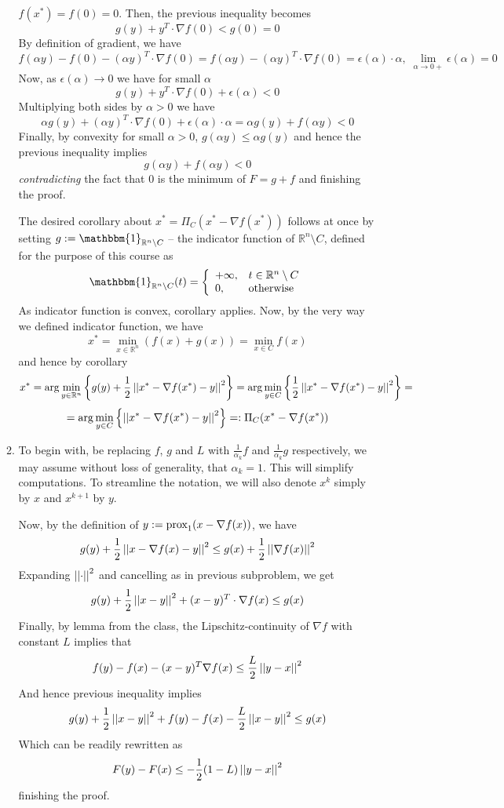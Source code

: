 \documentclass[8pt]{article} %
\begin{document}
\begin{enumerate}[label=\bfseries Problem \arabic*.]
\begin{enumerate}[label=(\alph*)]
				$f(x^*)=f(0)=0$. Then, the previous inequality becomes
				\[g(y)+y^T\cdot\nabla f(0)<g(0)=0\]
				By definition of gradient, we have
				\[f(\alpha y)-f(0)-(\alpha y)^T\cdot\nabla f(0)=
				f(\alpha y)-(\alpha y)^T\cdot\nabla f(0)=\epsilon(\alpha)\cdot
				{\alpha},\;\lim_{\alpha\to0+}\epsilon(\alpha)=0\]
				Now, as $\epsilon(\alpha)\to0$ we have for small $\alpha$
				\[g(y)+y^T\cdot\nabla f(0)+\epsilon(\alpha)<0\]
				Multiplying both sides by $\alpha>0$ we have
				\[\alpha g( y)+(\alpha y)^T\cdot\nabla f(0)+\epsilon(\alpha)\cdot\alpha=\alpha g(y)+f(\alpha y)<0\]
				Finally, by convexity for small $\alpha>0$, $g(\alpha y)\leq\alpha g(y)$ and hence the previous inequality
				implies
				\[ g(\alpha y)+f(\alpha y)<0\]
				{\it contradicting} the fact that $0$ is the minimum of $F=g+f$ and finishing the proof.
				
				The desired corollary about $x^*=\Pi_C(x^*-\nabla f(x^*))$ follows at once by setting $g:=\mathbbm{1}_{\mathbb{R}^n
				\setminus C}$ -- the indicator function of ${\mathbb{R}^n\setminus C}$, defined for the purpose of this course as
				\[\mathbbm{1}_{\mathbb{R}^n\setminus C}(t)=\left\{\begin{array}{ll}
					+\infty,&t\in\mathbb{R}^n\setminus C\\
					0,&\mbox{otherwise}
				\end{array}\right.\]
				As indicator function is convex, corollary applies. Now, by the very way we defined indicator function, we have
				\[x^*=\min_{x\in\mathbb{R}^n}(f(x)+g(x))=\min_{x\in C}f(x)\]
				and hence by corollary
				\[x^*=\arg\min_{y\in\mathbb{R}^n}\mycbra{g(y)+\frac{1}{2}\mynorm{x^*-\nabla f(x^*)-y}^2}=
				\arg\min_{y\in C}\mycbra{\frac{1}{2}\mynorm{x^*-\nabla f(x^*)-y}^2}=\]
				\[=\arg\min_{y\in C}\mycbra{\mynorm{x^*-\nabla f(x^*)-y}^2}=:\Pi_C(x^*-\nabla f(x^*))\]
			\item To begin with, be replacing $f$, $g$ and $L$
				with $\frac{1}{\alpha_k}f$ and $\frac{1}{\alpha_k}g$ respectively, we may assume without loss of generality,
				that $\alpha_k=1$. This will simplify computations. To streamline the notation, we will also denote $x^k$ simply
				by $x$ and $x^{k+1}$ by $y$.

				Now, by the definition of $y:=\mbox{prox}_1(x-\nabla f(x))$, we have
				\[g(y)+\frac{1}{2}\left|\left|x-\nabla f(x)-y\right|\right|^2\leq g(x)+\frac{1}{2}\left|\left|\nabla f(x)\right|\right|^2\]
				Expanding $\left|\left|\cdot\right|\right|^2$ and cancelling as in previous subproblem, we get
				\[g(y)+\frac{1}{2}\left|\left|x-y\right|\right|^2+(x-y)^T\cdot\nabla f(x)\leq g(x)\]
				Finally, by lemma from the class, the Lipschitz-continuity of $\nabla f$ with constant $L$ implies that
				\[f(y)-f(x)-(x-y)^T\nabla f(x)\leq \frac{L}{2}\left|\left|y-x\right|\right|^2\]
				And hence previous inequality implies
				\[g(y)+\frac{1}{2}\left|\left|x-y\right|\right|^2+f(y)-f(x)-\frac{L}{2}\left|\left|x-y\right|\right|^2\leq g(x)\]
				Which can be readily rewritten as
				\[F(y)-F(x)\leq -\frac{1}{2}(1-L)\left|\left|y-x\right|\right|^2\]
				finishing the proof.


\end{enumerate}
\end{enumerate}
\end{document}
